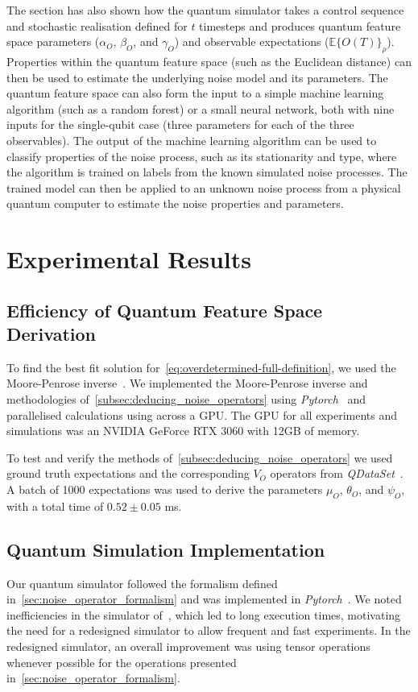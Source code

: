 \documentclass[12pt]{iopart}
\begin{document}
The section has also shown how the quantum simulator takes a control sequence and stochastic realisation defined for $t$ timesteps and produces quantum feature space parameters ($\alpha_O$, $\beta_O$, and $\gamma_O$) and observable expectations ($\mathbb{E}\{O(T)\}_\rho$). Properties within the quantum feature space (such as the Euclidean distance) can then be used to estimate the underlying noise model and its parameters. The quantum feature space can also form the input to a simple machine learning algorithm (such as a random forest) or a small neural network, both with nine inputs for the single-qubit case (three parameters for each of the three observables). The output of the machine learning algorithm can be used to classify properties of the noise process, such as its stationarity and type, where the algorithm is trained on labels from the known simulated noise processes. The trained model can then be applied to an unknown noise process from a physical quantum computer to estimate the noise properties and parameters.
\section{Experimental Results \label{sec:visulisation_of_noise_operator_parameters}}
\subsection{Efficiency of Quantum Feature Space Derivation \label{sec:quantum_feature_space_derivation_efficiency}}
To find the best fit solution for~\cref{eq:overdetermined-full-definition}, we used the Moore-Penrose inverse~\cite{penrose1955generalized}. We implemented the Moore-Penrose inverse and methodologies of~\cref{subsec:deducing_noise_operators} using \textit{Pytorch}~\cite{paszke2019pytorch} and parallelised calculations using across a GPU. The GPU for all experiments and simulations was an NVIDIA GeForce RTX 3060 with 12GB of memory.

To test and verify the methods of~\cref{subsec:deducing_noise_operators} we used ground truth expectations and the corresponding $V_O$ operators from \textit{QDataSet}~\cite{perrier2022qdataset}. A batch of 1000 expectations was used to derive the parameters $\mu_O$, $\theta_O$, and $\psi_O$, with a total time of $0.52 \pm 0.05$ ms.
\subsection{Quantum Simulation Implementation \label{subsec:quantum_simulation_implementation}}
Our quantum simulator followed the formalism defined in~\cref{sec:noise_operator_formalism} and was implemented in \textit{Pytorch}~\cite{paszke2019pytorch}. We noted inefficiencies in the simulator of~\cite{perrier2022qdataset}, which led to long execution times, motivating the need for a redesigned simulator to allow frequent and fast experiments. In the redesigned simulator, an overall improvement was using tensor operations whenever possible for the operations presented in~\cref{sec:noise_operator_formalism}.
\end{document}
